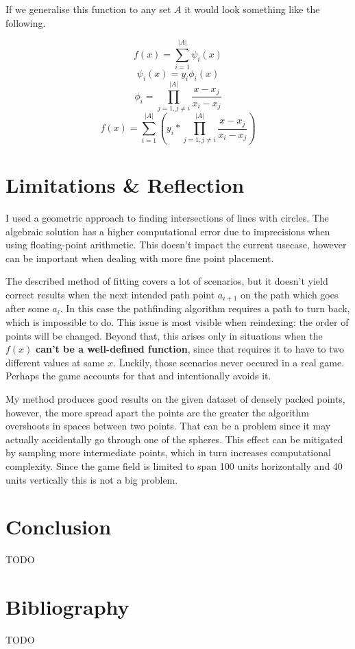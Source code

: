 \documentclass[12pt, titlepage]{article}
\newcommand{\TODO}{\begin{center}\color{red}TODO\end{center}}
\begin{document}
If we generalise this function to any set $A$ it would look something 
like the following.

$$f(x) = \sum_{i=1}^{|A|}\psi_i(x)$$
$$\psi_i(x) = y_i \phi_i(x)$$
\begin{equation}
    \phi_i = \prod_{j=1, j \neq i}^{|A|}\frac{x - x_j}{x_i - x_j}
\end{equation}
\begin{equation}
f(x) = \sum_{i=1}^{|A|} \left(y_i * \prod_{j=1, j \neq i}^{|A|} \frac{x - x_j}{x_i - x_j}\right)
\end{equation}

\section{Limitations \& Reflection}
I used a geometric approach to finding intersections of lines with circles.
The algebraic solution has a higher computational error due to imprecisions 
when using floating-point arithmetic. This doesn't impact the current usecase,
however can be important when dealing with more fine point placement.

The described method of fitting covers a lot of scenarios, but it doesn't yield 
correct results
when the next intended path point $a_{i + 1}$ on the path which goes after 
some $a_i$. In this case the pathfinding algorithm requires a path to turn back,
which is impossible to do. This issue is most visible when reindexing: the order
of points will be changed. Beyond that, this arises only in situations when the 
$f(x)$ \textbf{can't be a well-defined function}, since that requires it to have to
two different values at same $x$. Luckily, those scenarios never occured in a 
real game. Perhaps the game accounts for that and intentionally avoids it.

My method produces good results on the given dataset of densely packed points,
however, the more spread apart the points are the greater the algorithm
overshoots in spaces between two points. That can be a problem since it may 
actually accidentally go through one of the spheres. This effect can be
mitigated by sampling more intermediate points, which in turn increases 
computational complexity. Since the game field is  limited to span 100 units
horizontally and 40 units vertically this is not a big problem. 

\section{Conclusion}
\TODO

\section{Bibliography}
\appendix
\TODO
\end{document}
